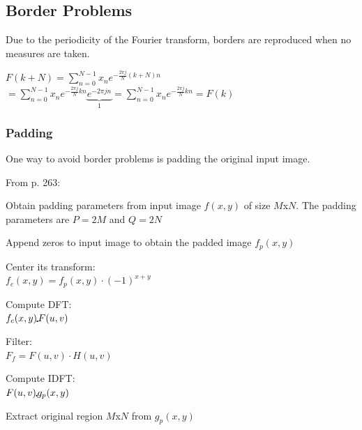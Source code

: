 \begin{minipage}{8cm}

\subsection{Border Problems}
  Due to the periodicity of the Fourier transform, borders are reproduced when no measures are taken.
  
  $F(k+N) = \sum\limits_{n=0}^{N-1} x_n e^{-\frac{2\pi j}{N} (k+N) n}$\\
  $=\sum\limits_{n=0}^{N-1} x_n e^{-\frac{2\pi j}{N} k n}  \underbrace{e^{-2 \pi j n}}_{1} = 
    \sum\limits_{n=0}^{N-1} x_n e^{-\frac{2\pi j}{N} k n} = F(k)$

\subsubsection{Padding}
  One way to avoid border problems is padding the original input image.
  
  From p. 263:
  \begin{aufzaehlung}
    \item Obtain padding parameters from input image $f(x,y)$ of size $M$x$N$. The padding parameters are 
    $P = 2M$ and $Q = 2N$
    \item Append zeros to input image to obtain the padded image $f_p(x,y)$
    \item Center its transform:\\
      $f_c(x,y) = f_p(x,y) \cdot (-1)^{x+y}$
    \item Compute DFT:\\
      $f_c(x,y) \FT F(u,v)$
    \item Filter:\\
      $F_f = F(u,v) \cdot H(u,v)$
    \item Compute IDFT:\\
      $F(u,v) \IFT g_p(x,y)$
    \item Extract original region $M$x$N$ from $g_p(x,y)$
  \end{aufzaehlung}
\end{minipage}

